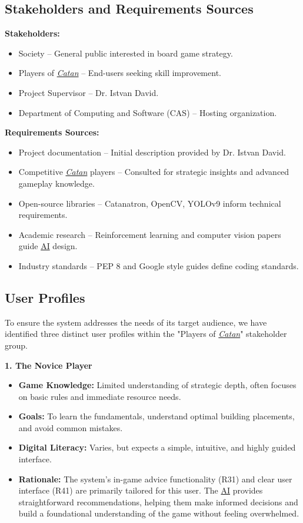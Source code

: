 \documentclass{article}
\newcommand{\Catan}{\href{https://en.wikipedia.org/wiki/Catan}{Catan}}
\newcommand{\AI}{\href{https://en.wikipedia.org/wiki/Artificial_intelligence}{AI}}
\begin{document}
\subsection{Stakeholders and Requirements Sources}\label{subsec:stakeholders-and-requirements-sources}
\textbf{Stakeholders:}
\begin{itemize}
    \item Society – General public interested in board game strategy.
    \item Players of \emph{\Catan{}} – End-users seeking skill improvement.
    \item Project Supervisor – Dr. Istvan David.
    \item Department of Computing and Software (CAS) – Hosting organization.
\end{itemize}

\noindent\textbf{Requirements Sources:}
\begin{itemize}
    \item Project documentation – Initial description provided by Dr. Istvan David.
    \item Competitive \emph{\Catan{}} players – Consulted for strategic insights and advanced gameplay knowledge.
    \item Open-source libraries – Catanatron, OpenCV, YOLOv9 inform technical requirements.
    \item Academic research – Reinforcement learning and computer vision papers guide \AI{} design.
    \item Industry standards – PEP 8 and Google style guides define coding standards.
\end{itemize}


\subsection{User Profiles}\label{subsec:User Profiles}
To ensure the system addresses the needs of its target audience, we have identified three distinct user profiles within the "Players of \emph{\Catan{}}" stakeholder group.

\hspace{1cm}

\noindent\textbf{1. The Novice Player}
\begin{itemize}
    \item \textbf{Game Knowledge:} Limited understanding of strategic depth, often focuses on basic rules and immediate resource needs.
    \item \textbf{Goals:} To learn the fundamentals, understand optimal building placements, and avoid common mistakes.
    \item \textbf{Digital Literacy:} Varies, but expects a simple, intuitive, and highly guided interface.
    \item \textbf{Rationale:} The system's in-game advice functionality (R31) and clear user interface (R41) are primarily tailored for this user. The \AI{} provides straightforward recommendations, helping them make informed decisions and build a foundational understanding of the game without feeling overwhelmed.
\end{itemize}
\end{document}
